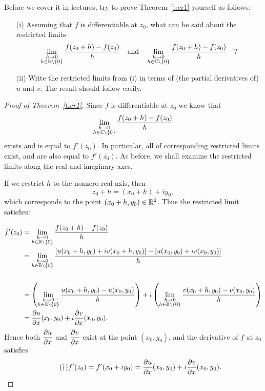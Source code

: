 \begin{exercise}
Before we cover it in lectures, try to prove Theorem~\ref{t:cr1} yourself as follows:
\begin{enumerate}
\item[(i)] Assuming that $f$ is differentiable at $z_0$, what can be said about the restricted limits
\[
\displaystyle \lim_{\substack{h \to 0 \\ h \in \mathbb{R} \backslash \left\{0\right\}}} \frac{f(z_0+h)-f(z_0)}{h} \quad\text{and}\quad \displaystyle \lim_{\substack{h \to 0 \\ h \in \mathbb{C} \backslash \left\{0\right\}}} \frac{f(z_0+h)-f(z_0)}{h} \quad ?
\]
\item[(ii)] Write the restricted limits from (i) in terms of (the partial derivatives of) $u$ and $v$.  The result should follow easily.
\end{enumerate}
\end{exercise}
\begin{proof}[Proof of Theorem~\ref{t:cr1}]
Since $f$ is differentiable at $z_0$ we know that
\[
\displaystyle \lim_{\substack{h\to 0 \\ h \in \mathbb{C} \backslash \left\{0\right\}}} \frac{f(z_0+h)-f(z_0)}{h}
\]
exists and is equal to $f'(z_0)$.  In particular, all of corresponding restricted limits exist, and are also equal to $f'(z_0)$.  As before, we shall examine the restricted limits along the real and imaginary axes.

If we restrict $h$ to the nonzero real axis, then
\[
z_0+h = (x_0+h)+iy_0,
\]
which corresponds to the point $(x_0+h,y_0) \in \mathbb{R}^2$.  Thus the restricted limit satisfies:

\begin{align*}
f'(z_0) & = \rlim{h \to 0}{h \in \R \backslash \set{0}} \frac{f(z_0+h)-f(z_0)}{h} \\
& = \rlim{h \to 0}{h \in \R \backslash \set{0}} \frac{\left[ u(x_0+h,y_0)+iv(x_0+h,y_0) \right] - \left[ u(x_0,y_0)+iv(x_0,y_0) \right]}{h} \\
& \vspace*{2cm} \\
& = \left( \rlim{h \to 0}{h \in \R \backslash \set{0}} \frac{u(x_0+h,y_0)-u(x_0,y_0)}{h}  \right) +i \left(  \rlim{h \to 0}{h \in \R \backslash \set{0}} \frac{v(x_0+h,y_0)-v(x_0,y_0)}{h} \right)  \\
& = \pd{u}{x} (x_0,y_0)+i \pd{v}{x} (x_0,y_0).
\end{align*}
Hence both $\dfrac{\partial u}{\partial x}$ and $\dfrac{\partial v}{\partial x}$ exist at the point $(x_0,y_0)$, and the derivative of $f$ at $z_0$ satisfies
\begin{equation}
\label{eq:cr1}
\tag{$\dagger$}
f'(z_0) = f'(x_0+iy_0) = \dfrac{\partial u}{\partial x} (x_0,y_0)+i \dfrac{\partial v}{\partial x} (x_0,y_0).
\end{equation}


\end{proof}
